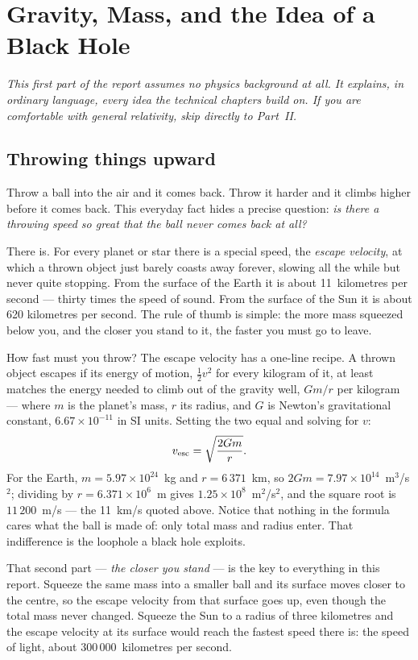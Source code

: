 \chapter{Gravity, Mass, and the Idea of a Black Hole}
\label{ch:f1}

\noindent\emph{This first part of the report assumes no physics background at
all. It explains, in ordinary language, every idea the technical chapters
build on. If you are comfortable with general relativity, skip directly to
Part~II.}

\section{Throwing things upward}

Throw a ball into the air and it comes back. Throw it harder and it climbs
higher before it comes back. This everyday fact hides a precise question:
\emph{is there a throwing speed so great that the ball never comes back at
all?}

There is. For every planet or star there is a special speed, the
\emph{escape velocity}, at which a thrown object just barely coasts away
forever, slowing all the while but never quite stopping. From the surface of
the Earth it is about 11~kilometres per second — thirty times the speed of
sound. From the surface of the Sun it is about 620 kilometres per second.
The rule of thumb is simple: the more mass squeezed below you, and the
closer you stand to it, the faster you must go to leave.

\begin{worked}{How fast must you throw?}
The escape velocity has a one-line recipe. A thrown object escapes if
its energy of motion, $\tfrac12 v^2$ for every kilogram of it, at least
matches the energy needed to climb out of the gravity well, $Gm/r$ per
kilogram — where $m$ is the planet's mass, $r$ its radius, and $G$ is
Newton's gravitational constant, $6.67\times10^{-11}$ in SI units.
Setting the two equal and solving for $v$:
\[
v_{\rm esc}=\sqrt{\frac{2Gm}{r}}.
\]
For the Earth, $m = 5.97\times10^{24}$~kg and $r = 6\,371$~km, so
$2Gm = 7.97\times10^{14}$~m$^3$/s$^2$; dividing by
$r = 6.371\times10^{6}$~m gives $1.25\times10^{8}$~m$^2$/s$^2$, and the
square root is $11\,200$~m/s — the 11~km/s quoted above. Notice that
nothing in the formula cares what the ball is made of: only total mass
and radius enter. That indifference is the loophole a black hole
exploits.
\end{worked}

That second part — \emph{the closer you stand} — is the key to everything
in this report. Squeeze the same mass into a smaller ball and its surface
moves closer to the centre, so the escape velocity from that surface goes
up, even though the total mass never changed. Squeeze the Sun to a radius of
three kilometres and the escape velocity at its surface would reach the
fastest speed there is: the speed of light, about
300\,000~kilometres per second.


